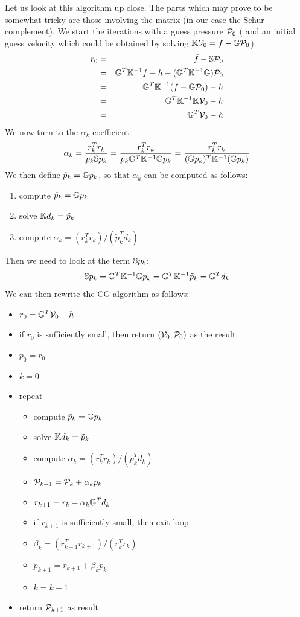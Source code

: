 Let us look at this algorithm up close. The parts which may prove to be somewhat tricky 
are those involving the matrix (in our case the Schur complement).
We start the iterations with a guess pressure ${\cal P}_0$ (
and an initial guess velocity which could be obtained by solving ${\mathbb{K}} {\cal V}_0 =f- {\mathbb{G}} {\cal P}_0$).
\begin{eqnarray}
r_0 
&=& \tilde{f}-{\mathbb{S}} {\cal P}_0 \\
&=& {\mathbb{G}}^T {\mathbb{K}}^{-1} f - h - ({\mathbb{G}}^T {\mathbb{K}}^{-1} {\mathbb{G}} ) {\cal P}_0 \\ 
&=& {\mathbb{G}}^T {\mathbb{K}}^{-1} (f - {\mathbb{G}} {\cal P}_0) - h \\
&=& {\mathbb{G}}^T {\mathbb{K}}^{-1} {\mathbb{K}} {\cal V}_0 - h \\ 
&=& {\mathbb{G}}^T {\cal V}_0 - h \\ 
\end{eqnarray}
We now turn to the $\alpha_k$ coefficient:
\[
\alpha_k 
= \frac{r_k^T r_k }{p_k {\mathbb{S}} p_k } 
= \frac{r_k^T r_k }{p_k {\mathbb{G}}^T {\mathbb{K}}^{-1} {\mathbb{G}}  p_k } 
= \frac{r_k^T r_k }{({\mathbb{G}} p_k)^T  {\mathbb{K}}^{-1} ({\mathbb{G}}  p_k) } 
\]
We then define $\tilde{p}_k = {\mathbb{G}} p_k$, so that $\alpha_k$ can be computed as follows:
\begin{enumerate}
\item compute $\tilde{p}_k = {\mathbb{G}} p_k$
\item solve ${\mathbb{K}} d_k = \tilde{p}_k$
\item compute $\alpha_k=(r_k^T r_k)/(\tilde{p}_k^T d_k)$
\end{enumerate}
Then we need to look at the term ${\mathbb{S}} p_k$:
\[
{\mathbb{S}} p_k = {\mathbb{G}}^T {\mathbb{K}}^{-1} {\mathbb{G}} p_k = {\mathbb{G}}^T {\mathbb{K}}^{-1} \tilde{p}_k = {\mathbb{G}}^T d_k
\]
We can then rewrite the CG algorithm as follows:
\begin{itemize}
\item $r_0 = {\mathbb{G}}^T {\cal V}_0 - h$ 
\item if $r_0$ is sufficiently small, then return $({\cal V}_0,{\cal P}_0)$ as the result
\item $p_0=r_0$
\item $k=0$
\item repeat
\begin{itemize}
\item compute $\tilde{p}_k = {\mathbb{G}} p_k$
\item solve ${\mathbb{K}} d_k = \tilde{p}_k$
\item compute $\alpha_k=(r_k^T r_k)/(\tilde{p}_k^T d_k)$
\item ${\cal P}_{k+1} = {\cal P}_k+\alpha_k p_k$
\item $r_{k+1} = r_k - \alpha_k {\mathbb{G}}^T d_k $
\item if $r_{k+1}$ is sufficiently small, then exit loop
\item $\beta_k=(r_{k+1}^T r_{k+1})/(r_k^T r_k)$
\item $p_{k+1} =r_{k+1}+ \beta_k p_k$
\item $k=k+1$
\end{itemize}
\item return ${\cal P}_{k+1}$ as result
\end{itemize}
